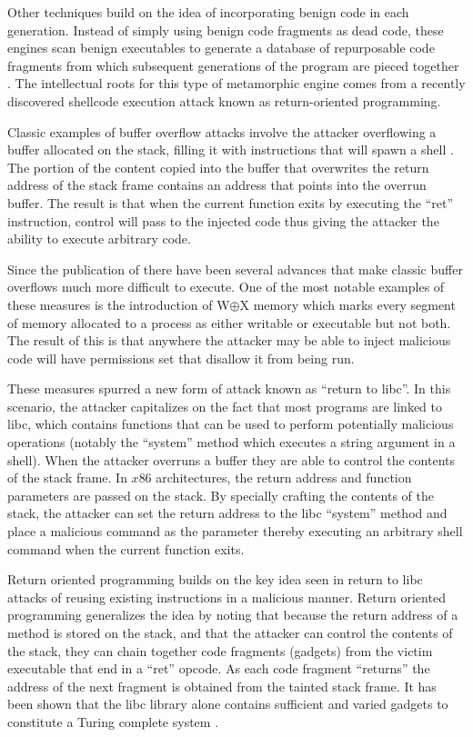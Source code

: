     Other techniques build on the idea of incorporating benign code in each
    generation. Instead of simply using benign code fragments as dead code,
    these engines scan benign executables to generate a database of repurposable
    code fragments from which subsequent generations of the program are pieced
    together \cite{franken}. The intellectual roots for this type of metamorphic
    engine comes from a recently discovered shellcode execution attack known as
    return-oriented programming.

    Classic examples of buffer overflow attacks involve the attacker overflowing
    a buffer allocated on the stack, filling it with instructions that will
    spawn a shell \cite{aleph}. The portion of the content copied into the
    buffer that overwrites the return address of the stack frame contains an
    address that points into the overrun buffer. The result is that when the
    current function exits by executing the ``ret'' instruction, control will
    pass to the injected code thus giving the attacker the ability to execute
    arbitrary code.

    Since the publication of \cite{aleph} there have been several advances that
    make classic buffer overflows much more difficult to execute. One of the
    most notable examples of these measures is the introduction of W$\oplus$X
    memory which marks every segment of memory allocated to a process as either
    writable or executable but not both. The result of this is that anywhere the
    attacker may be able to inject malicious code will have permissions set that
    disallow it from being run.

    These measures spurred a new form of attack known as ``return to libc''. In
    this scenario, the attacker capitalizes on the fact that most programs are
    linked to libc, which contains functions that can be used to perform
    potentially malicious operations (notably the ``system'' method which
    executes a string argument in a shell). When the attacker overruns a buffer
    they are able to control the contents of the stack frame. In $x86$
    architectures, the return address and function parameters are passed on the
    stack. By specially crafting the contents of the stack, the attacker can set
    the return address to the libc ``system'' method and place a malicious
    command as the parameter thereby executing an arbitrary shell command when
    the current function exits.

    Return oriented programming builds on the key idea seen in return to libc
    attacks of reusing existing instructions in a malicious manner. Return
    oriented programming generalizes the idea by noting that because the return
    address of a method is stored on the stack, and that the attacker can
    control the contents of the stack, they can chain together code fragments
    (gadgets) from the victim executable that end in a ``ret'' opcode. As each
    code fragment ``returns'' the address of the next fragment is obtained from
    the tainted stack frame. It has been shown that the libc library alone
    contains sufficient and varied gadgets to constitute a Turing complete
    system \cite{rop_geo}.

